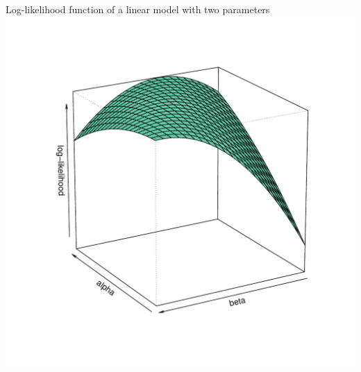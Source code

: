 \documentclass[xcolor=table,dvipsnames]{beamer}
\begin{document}
\begin{frame}{Log-likelihood function of a linear model with two parameters}
\centering
\includegraphics[scale=0.45]{pictures/week_24_ll_linear.pdf} 
\end{frame}

\end{document}

